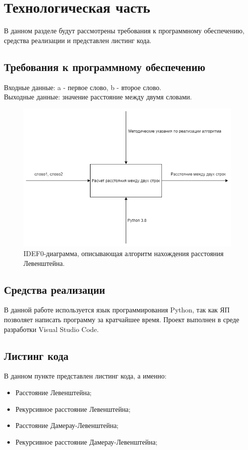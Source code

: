 \documentclass[a4paper, 12pt]{article}
\begin{document}
\newpage
\section{Технологическая часть}
\begin{flushleft}
	\hspace*{5mm} В данном разделе будут рассмотрены требования к программному обеспечению, средства реализации и представлен листинг кода.
	\subsection{Требования к программному обеспечению}
	\hspace*{5mm} Входные данные: a - первое слово, b - второе слово.
	\\ \hspace*{5mm} Выходные данные: значение расстояние между двумя словами.
	\begin{figure}[h]
		\centering \includegraphics[scale=0.6]{диаграмма}
		\centering\caption{IDEF0-диаграмма, описывающая алгоритм нахождения расстояния Левенштейна.}
	\end{figure}
	\subsection{Средства реализации}
	\hspace*{5mm} В данной работе используется язык программирования Python, так как ЯП позволяет написать программу за кратчайшее время. Проект выполнен в среде разработки Visual Studio Code.
	\subsection{Листинг кода}
	В данном пункте представлен листинг кода, а именно:
	\begin{itemize}
		\item Расстояние Левенштейна;
		\item Рекурсивное расстояние Левенштейна;
		\item Расстояние Дамерау-Левенштейна;
		\item Рекурсивное расстояние Дамерау-Левенштейна;
	\end{itemize}


\end{flushleft}
\end{document}
